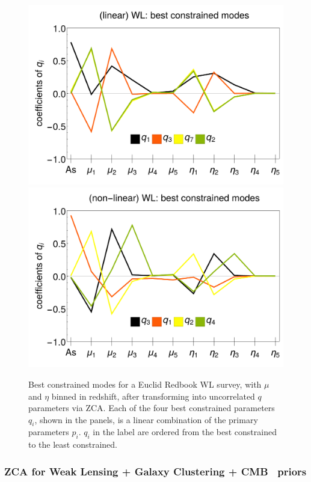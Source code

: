 \begin{figure}[htbp]
	\centering{}\includegraphics[width=0.47\linewidth]{Chapters/linear-nonlinear-MG-forecasts/figures/Decorrelations-WL/linear_WL--_best_constrained_modes-Errors_on_q_ZCA_SquareNorm--_fiducialMGBin3_Euclid_WL_linearPK_}
	\includegraphics[width=0.47\linewidth]{Chapters/linear-nonlinear-MG-forecasts/figures/Decorrelations-WL/non-linear_WL--_best_constrained_modes-Errors_on_q_ZCA_SquareNorm--_fiducialMGBin3_Euclid_WL_nonlinearPk__Zhao_}
	\caption[Best constrained modes for Euclid GC applying ZCA.]{\label{fig:WLbestconst}
Best constrained modes for a Euclid Redbook WL survey, 
with $\mu$ and $\eta$ binned in redshift, after transforming into uncorrelated $q$ parameters via ZCA.
Each of the four best constrained parameters $q_i$, shown in the panels, is a linear combination of the primary parameters $p_i$. $q_i$ in the label are ordered from the best constrained to the least constrained.}
\end{figure}





\subsubsection{ZCA for Weak Lensing + Galaxy Clustering +  CMB \planck\ priors}

